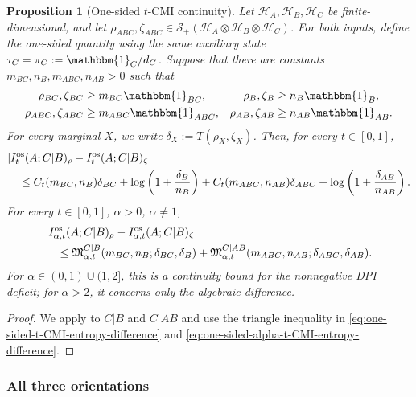 \documentclass[11pt]{article}
\newtheorem{proposition}[proposition]{Proposition}
\theoremstyle{remark}
\DeclareMathOperator{\os}{os}
\newcommand{\1}{\mathbbm{1}}
\begin{document}
\begin{proposition}[One-sided $t$-CMI continuity]
\label{prop:tCMI-spectral-slab-continuity}
Let $\mathcal H_A,\mathcal H_B,\mathcal H_C$ be finite-dimensional,
and let $\rho_{ABC},\zeta_{ABC}\in
\mathcal S_+(\mathcal H_A\otimes\mathcal H_B\otimes\mathcal H_C)$.
For both inputs, define the one-sided quantity using the same
auxiliary state $\tau_C=\pi_C:=\1_C/d_C$.  Suppose that there are
constants $m_{BC},n_B,m_{ABC},n_{AB}>0$ such that
\begin{align}
 \rho_{BC},\zeta_{BC}&\geq m_{BC}\1_{BC},
 &\rho_B,\zeta_B&\geq n_B\1_B,\notag\\
 \rho_{ABC},\zeta_{ABC}&\geq m_{ABC}\1_{ABC},
 &\rho_{AB},\zeta_{AB}&\geq n_{AB}\1_{AB}.
 \label{eq:tCMI-common-spectral-floors}
\end{align}
For every marginal $X$, we write
$\delta_X:=T(\rho_X,\zeta_X)$.
Then, for every $t\in[0,1]$,
\begin{align}
 &|I_t^{\os}(A;C|B)_\rho-I_t^{\os}(A;C|B)_\zeta|
 \notag\\
 &\quad\leq
 C_t(m_{BC},n_B)\delta_{BC}
 +\log\left(1+\frac{\delta_B}{n_B}\right)
 +C_t(m_{ABC},n_{AB})\delta_{ABC}
 +\log\left(1+\frac{\delta_{AB}}{n_{AB}}\right).
 \label{eq:tCMI-order-one-slab-bound}
\end{align}
For every $t\in[0,1]$, $\alpha>0$, $\alpha\neq1$,
\begin{align}
 &|I_{\alpha,t}^{\os}(A;C|B)_\rho
          -I_{\alpha,t}^{\os}(A;C|B)_\zeta|
 \notag\\
 &\quad\leq
 \mathfrak M_{\alpha,t}^{C|B}
       (m_{BC},n_B;\delta_{BC},\delta_B)
 +\mathfrak M_{\alpha,t}^{C|AB}
       (m_{ABC},n_{AB};\delta_{ABC},\delta_{AB}).
 \label{eq:tCMI-Renyi-slab-bound}
\end{align}
For $\alpha\in(0,1)\cup(1,2]$, this is a continuity bound for the
nonnegative DPI deficit; for $\alpha>2$, it concerns only the
algebraic difference.
\end{proposition}

\begin{proof}
We apply  to $C|B$ and
$C|AB$ and use the triangle inequality in
\eqref{eq:one-sided-t-CMI-entropy-difference} and
\eqref{eq:one-sided-alpha-t-CMI-entropy-difference}.
\end{proof}

\subsubsection{All three orientations}
\end{document}
